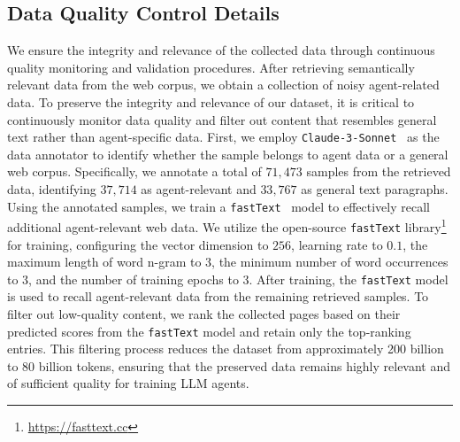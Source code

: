 


\subsection{Data Quality Control Details}
\label{app:4-3}
We ensure the integrity and relevance of the collected data through continuous quality monitoring and validation procedures.
After retrieving semantically relevant data from the web corpus, we obtain a collection of noisy agent-related data. To preserve the integrity and relevance of our dataset, it is critical to continuously monitor data quality and filter out content that resembles general text rather than agent-specific data. First, we employ \texttt{Claude-3-Sonnet}~\cite{claude-3} as the data annotator to identify whether the sample belongs to agent data or a general web corpus.
Specifically, we annotate a total of $71,473$ samples from the retrieved data, identifying $37,714$ as agent-relevant and $33,767$ as general text paragraphs.
Using the annotated samples, we train a \texttt{fastText}~\cite{joulin2016fasttext} model to effectively recall additional agent-relevant web data. 
We utilize the open-source \texttt{fastText} library\footnote{\url{https://fasttext.cc}} for training, configuring the vector dimension to $256$, learning rate to $0.1$, the maximum length of word n-gram to $3$, the minimum number of word occurrences to $3$, and the number of training epochs to $3$.
After training, the \texttt{fastText} model is used to recall agent-relevant data from the remaining retrieved samples. To filter out low-quality content, we rank the collected pages based on their predicted scores from the \texttt{fastText} model and retain only the top-ranking entries. This filtering process reduces the dataset from approximately 200 billion to 80 billion tokens, ensuring that the preserved data remains highly relevant and of sufficient quality for training LLM agents.




